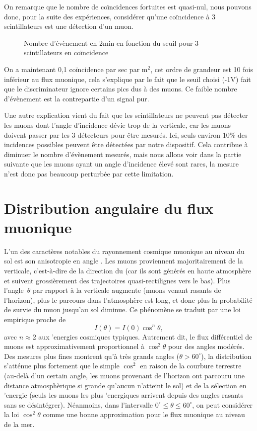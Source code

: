\documentclass[a4paper,12pt,twoside]{article}
\begin{document}
On remarque que le nombre de coïncidences fortuites est quasi-nul, nous pouvons donc, pour la suite des expériences, considérer qu’une coïncidence à 3 scintillateurs est une détection d’un muon.

\begin{figure}[h!]
    \centering
    \caption{Nombre d’évènement en 2min en fonction du seuil pour 3 scintillateurs en coïncidence}
\end{figure}

On a maintenant 0,1 coïncidence par sec par m$^2$, cet ordre de grandeur est 10 fois inférieur au flux muonique, cela s’explique par le fait que le seuil choisi (-1V) fait que le discriminateur ignore certains pics dus à des muons. Ce faible nombre d’évènement est la contrepartie d’un signal pur.

Une autre explication vient du fait que les scintillateurs ne peuvent pas détecter les muons dont l’angle d’incidence dévie trop de la verticale, car les muons doivent passer par les 3 détecteurs pour être mesurés. Ici, seuls environ 10\% des incidences possibles peuvent être détectées par notre dispositif. Cela contribue à diminuer le nombre d’évènement mesurés, mais nous allons voir dans la partie suivante que les muons ayant un angle d’incidence élevé sont rares, la mesure n’est donc pas beaucoup perturbée par cette limitation.

\section{Distribution angulaire du flux muonique}
L'un des caract\`eres notables du rayonnement cosmique muonique au niveau du sol est son anisotropie en angle . Les muons proviennent majoritairement de la verticale, c'est-\`a-dire de la direction du  (car ils sont g\'en\'er\'es en haute atmosph\`ere et suivent grossi\`erement des trajectoires quasi-rectilignes vers le bas). Plus l'angle~$\theta$ par rapport \`a la verticale augmente (muons venant rasants de l'horizon), plus le parcours dans l'atmosph\`ere est long, et donc plus la probabilit\'e de survie du muon jusqu'au sol diminue. Ce ph\'enom\`ene se traduit par une loi empirique proche de
\[
  I(\theta) = I(0)\cos^n\theta,
\]
avec $n \approx 2$ aux 'energies cosmiques typiques. Autrement dit, le flux diff\'erentiel de muons est approximativement proportionnel \`a $\cos^2\theta$ pour des angles mod\'er\'es. Des mesures plus fines montrent qu'\`a tr\`es grands angles ($\theta > 60^\circ$), la distribution s'att\'enue plus fortement que le simple $\cos^2$ en raison de la courbure terrestre (au-del\`a d'un certain angle, les muons provenant de l'horizon ont parcouru une distance atmosph\`erique si grande qu'aucun n'atteint le sol) et de la s\'election en 'energie (seuls les muons les plus 'energiques arrivent depuis des angles rasants sans se d\'esint\'egrer). N\'eanmoins, dans l'intervalle $0^\circ \le \theta \leq 60^\circ$, on peut consid\'erer la loi $\cos^2\theta$ comme une bonne approximation pour le flux muonique au niveau de la mer.
\end{document}
